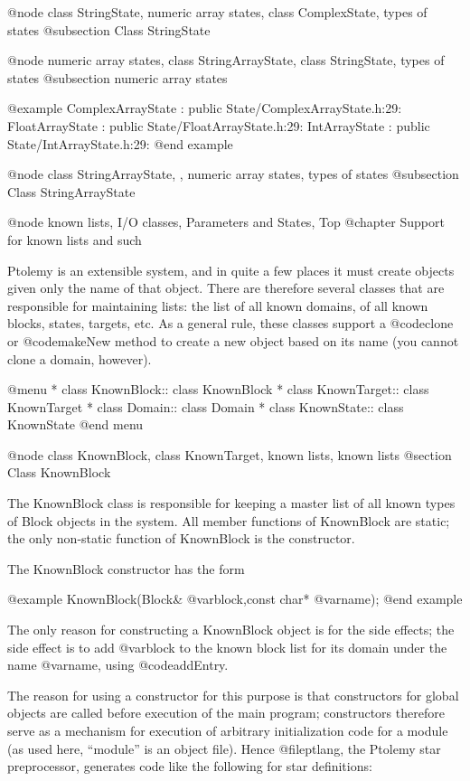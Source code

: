 @node class StringState, numeric array states, class ComplexState, types of states
@subsection Class StringState

@node numeric array states, class StringArrayState, class StringState, types of states
@subsection numeric array states

@example
ComplexArrayState : public State/ComplexArrayState.h:29:
FloatArrayState : public State/FloatArrayState.h:29:
IntArrayState : public State/IntArrayState.h:29:
@end example

@node class StringArrayState,  , numeric array states, types of states
@subsection Class StringArrayState

@node known lists, I/O classes, Parameters and States, Top
@chapter Support for known lists and such

Ptolemy is an extensible system, and in quite a few places it must
create objects given only the name of that object.  There are therefore
several classes that are responsible for maintaining lists: the list of
all known domains, of all known blocks, states, targets, etc.  As a
general rule, these classes support a @code{clone} or @code{makeNew}
method to create a new object based on its name (you cannot clone a
domain, however).

@menu
* class KnownBlock::            class KnownBlock
* class KnownTarget::           class KnownTarget
* class Domain::                class Domain
* class KnownState::            class KnownState
@end menu

@node class KnownBlock, class KnownTarget, known lists, known lists
@section Class KnownBlock

The KnownBlock class is responsible for keeping a master list of all
known types of Block objects in the system.  All member functions of
KnownBlock are static; the only non-static function of KnownBlock is
the constructor.

The KnownBlock constructor has the form

@example
KnownBlock(Block& @var{block},const char* @var{name});
@end example

The only reason for constructing a KnownBlock object is for the side
effects; the side effect is to add @var{block} to the known block list
for its domain under the name @var{name}, using @code{addEntry}.

The reason for using a constructor for this purpose is that constructors
for global objects are called before execution of the main program;
constructors therefore serve as a mechanism for execution of arbitrary
initialization code for a module (as used here, ``module'' is an object
file).  Hence @file{ptlang}, the Ptolemy star preprocessor, generates
code like the following for star definitions:

